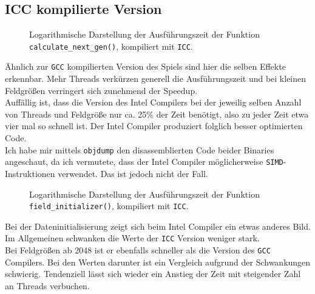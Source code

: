 \documentclass[german,plainarticle,hyperref,utf8]{zihpub}
\begin{document}
	\subsection{ICC kompilierte Version}
	\begin{figure}[h]
		\begin{center}
			
		\end{center}
		\caption{Logarithmische Darstellung der Ausführungszeit der Funktion \texttt{calculate\_next\_gen()}, kompiliert mit \texttt{ICC}.}
	\end{figure}
	Ähnlich zur \texttt{GCC} kompilierten Version des Spiels sind hier die selben Effekte erkennbar. Mehr Threads verkürzen generell die Ausführungszeit und bei kleinen Feldgrößen verringert sich zunehmend der Speedup.\\
	Auffällig ist, dass die Version des Intel Compilers bei der jeweilig selben Anzahl von Threads und Feldgröße nur ca. 25\% der Zeit benötigt, also zu jeder Zeit etwa vier mal so schnell ist. Der Intel Compiler produziert folglich besser optimierten Code.\\
	Ich habe mir mittels \texttt{objdump} den disassemblierten Code beider Binaries angeschaut, da ich vermutete, dass der Intel Compiler möglicherweise \texttt{SIMD}-Instruktionen verwendet. Das ist jedoch nicht der Fall.
	\newpage
	\begin{figure}[h]
		\begin{center}
			
		\end{center}
		\caption{Logarithmische Darstellung der Ausführungszeit der Funktion \texttt{field\_initializer()}, kompiliert mit \texttt{ICC}.}
	\end{figure}
	Bei der Dateninitialisierung zeigt sich beim Intel Compiler ein etwas anderes Bild. Im Allgemeinen schwanken die Werte der \texttt{ICC} Version weniger stark.\\
	Bei Feldgrößen ab 2048 ist er ebenfalls schneller als die Version des \texttt{GCC} Compilers. Bei den Werten darunter ist ein Vergleich aufgrund der Schwankungen schwierig. Tendenziell lässt sich wieder ein Anstieg der Zeit mit steigender Zahl an Threads verbuchen.
	\newpage
	\appendix
\end{document}

